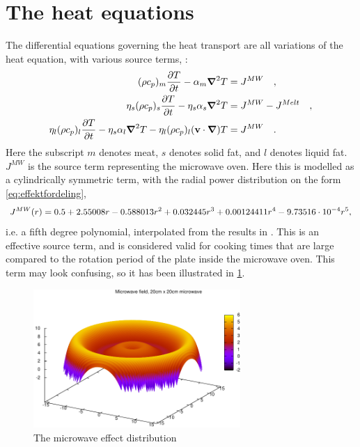 \section{The heat equations}
The differential equations governing the heat transport are all variations of the heat
equation, with various source terms, :
\begin{align}
  \label{eq:heat1}
  (\rho c_p)_m \frac{\partial T}{\partial t} - \alpha_m \mbox{\boldmath$ \nabla $} ^2 T &= J^{MW} \quad \rm{,} \\
  \label{eq:heat2}
  \eta_s (\rho c_p)_s \frac{\partial T}{\partial t} - \eta_s\alpha_s \mbox{\boldmath$ \nabla $} ^2 T &= J^{MW} - J^{Melt}  \quad \rm{,} \\
  \label{eq:heat3}
  \eta_l (\rho c_p)_l \frac{\partial T}{\partial t} - \eta_s\alpha_l \mbox{\boldmath$ \nabla $} ^2 T - \eta_l(\rho c_p)_l(\mathbf{v}\cdot
  \mbox{\boldmath$ \nabla $})T &= J^{MW}  \quad \rm{.}
\end{align}
Here the subscript $m$ denotes meat, $s$ denotes solid fat, and $l$ denotes
liquid fat. $J^{MW}$ is the source term representing the microwave oven.
Here this is modelled as a cylindrically symmetric term,
with the radial power distribution on the form \cref{eq:effektfordeling},
\begin{equation}
  J^{MW}(r) = 0.5 + 2.55008r - 0.588013r^2 + 0.032445r^3 + 0.00124411r^4 -
  9.73516\cdot 10^{-4}r^5 \rm{,}
  \label{eq:effektfordeling}
\end{equation}
i.e. a fifth degree polynomial, interpolated from the results in
\cite{huang+zhu}. This is an effective source term, and is considered valid for
cooking times that are large compared to the rotation period of the plate inside
the microwave oven. This term may look confusing, so it has been illustrated in
\cref{fig:microwave}.\\

\begin{figure}[h!]
  \begin{center}
    \includegraphics[width=0.7\textwidth]{microwave.pdf}
  \end{center}
  \caption{The microwave effect distribution}
  \label{fig:microwave}
\end{figure}

